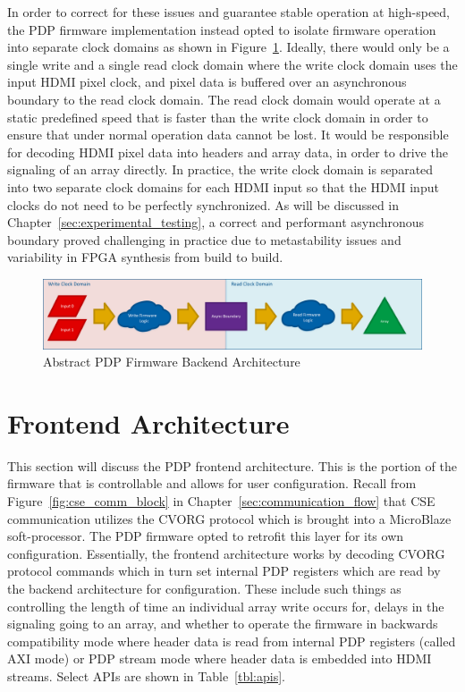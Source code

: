     In order to correct for these issues and guarantee stable operation at high-speed, the PDP firmware implementation instead opted to isolate firmware operation into separate clock domains as shown in Figure~\ref{fig:abstract_architecture}. Ideally, there would only be a single write and a single read clock domain where the write clock domain uses the input HDMI pixel clock, and pixel data is buffered over an asynchronous boundary to the read clock domain. The read clock domain would operate at a static predefined speed that is faster than the write clock domain in order to ensure that under normal operation data cannot be lost. It would be responsible for decoding HDMI pixel data into headers and array data, in order to drive the signaling of an array directly. In practice, the write clock domain is separated into two separate clock domains for each HDMI input so that the HDMI input clocks do not need to be perfectly synchronized. As will be discussed in Chapter~\ref{sec:experimental_testing}, a correct and performant asynchronous boundary proved challenging in practice due to metastability issues and variability in FPGA synthesis from build to build.

    \begin{figure}
        \centering
        \includegraphics[width=1.0\textwidth]{fig/abstract_architecture.pdf}
        \caption{Abstract PDP Firmware Backend Architecture}
        \label{fig:abstract_architecture}
    \end{figure}

\section{Frontend Architecture}
    \label{sec:frontend_arch}
    This section will discuss the PDP frontend architecture. This is the portion of the firmware that is controllable and allows for user configuration. Recall from Figure~\ref{fig:cse_comm_block} in Chapter~\ref{sec:communication_flow} that CSE communication utilizes the CVORG protocol which is brought into a MicroBlaze soft-processor. The PDP firmware opted to retrofit this layer for its own configuration. Essentially, the frontend architecture works by decoding CVORG protocol commands which in turn set internal PDP registers which are read by the backend architecture for configuration. These include such things as controlling the length of time an individual array write occurs for, delays in the signaling going to an array, and whether to operate the firmware in backwards compatibility mode where header data is read from internal PDP registers (called AXI mode) or PDP stream mode where header data is embedded into HDMI streams. Select APIs are shown in Table~\ref{tbl:apis}.

